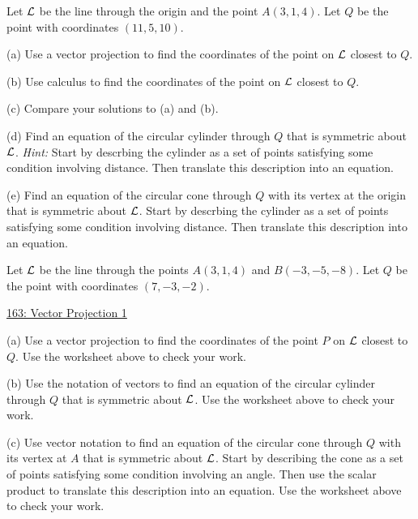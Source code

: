 \documentclass{ximera}
\begin{document}
\begin{question}  \label{Qfgsadge:Scalar}
Let ${\cal L}$ be the line through the origin and the point $A(3,1,4)$. Let $Q$ be the point with coordinates $(11,5,10)$.

(a) Use a vector projection to find the coordinates of the point on ${\cal L}$ closest to $Q$.

(b) Use calculus to find the coordinates of the point on ${\cal L}$ closest to $Q$.

(c) Compare your solutions to (a) and (b).

(d) Find an equation of the circular cylinder through $Q$ that is symmetric about ${\cal L}$. {\it Hint:} Start by descrbing the cylinder as a set of points satisfying some condition involving distance. Then translate this description into an equation.

(e) Find an equation of the circular cone through $Q$ with its vertex at the origin that is symmetric about ${\cal L}$. Start by descrbing the cylinder as a set of points satisfying some condition involving distance. Then translate this description into an equation.
\end{question}


\begin{question}  \label{Qfgs643r6e:Scalar}
Let ${\cal L}$ be the line through the points $A(3,1,4)$ and $B(-3,-5,-8)$. Let $Q$ be the point with coordinates $(7,-3,-2)$.

\begin{onlineOnly}
    \begin{center}
\end{center}
\end{onlineOnly}
 
\href{https://www.desmos.com/3d/lrvizzj9jf}{163: Vector Projection 1}

(a) Use a vector projection to find the coordinates of the point $P$ on ${\cal L}$ closest to $Q$. Use the worksheet above to check your work.

(b) Use the notation of vectors to find an equation of the circular cylinder through $Q$ that is symmetric about ${\cal L}$. Use the worksheet above to check your work.

(c) Use vector notation to find an equation of the circular cone through $Q$ with its vertex at $A$ that is symmetric about ${\cal L}$. Start by describing the cone as a set of points satisfying some condition involving an angle. Then use the scalar product to translate this description into an equation. Use the worksheet above to check your work.




\end{question}
\end{document}
